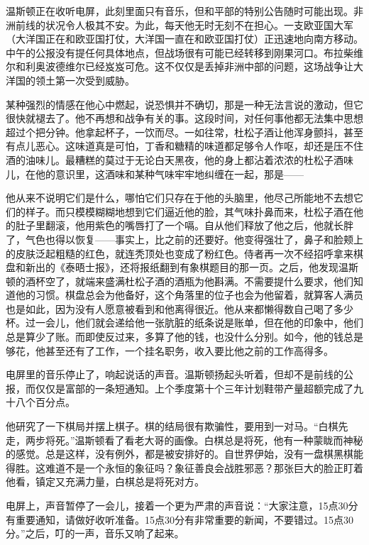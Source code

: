 温斯顿正在收听电屏，此刻里面只有音乐，但和平部的特别公告随时可能出现。非洲前线的状况令人极其不安。为此，每天他无时无刻不在担心。一支欧亚国大军（大洋国正在和欧亚国打仗，大洋国一直在和欧亚国打仗）正迅速地向南方移动。中午的公报没有提任何具体地点，但战场很有可能已经转移到刚果河口。布拉柴维尔和利奥波德维尔已经岌岌可危。这不仅仅是丢掉非洲中部的问题，这场战争让大洋国的领土第一次受到威胁。

某种强烈的情感在他心中燃起，说恐惧并不确切，那是一种无法言说的激动，但它很快就褪去了。他不再想和战争有关的事。这段时间，对任何事他都无法集中思想超过个把分钟。他拿起杯子，一饮而尽。一如往常，杜松子酒让他浑身颤抖，甚至有点儿恶心。这味道真是可怕，丁香和糖精的味道都足够令人作呕，却还是压不住酒的油味儿。最糟糕的莫过于无论白天黑夜，他的身上都沾着浓浓的杜松子酒味儿，在他的意识里，这酒味和某种气味牢牢地纠缠在一起，那是——

他从来不说明它们是什么，哪怕它们只存在于他的头脑里，他尽己所能地不去想它们的样子。而只模模糊糊地想到它们逼近他的脸，其气味扑鼻而来，杜松子酒在他的肚子里翻滚，他用紫色的嘴唇打了一个嗝。自从他们释放了他之后，他就长胖了，气色也得以恢复——事实上，比之前的还要好。他变得强壮了，鼻子和脸颊上的皮肤泛起粗糙的红色，就连秃顶处也变成了粉红色。侍者再一次不经招呼拿来棋盘和新出的《泰晤士报》，还将报纸翻到有象棋题目的那一页。之后，他发现温斯顿的酒杯空了，就端来盛满杜松子酒的酒瓶为他斟满。不需要提什么要求，他们知道他的习惯。棋盘总会为他备好，这个角落里的位子也会为他留着，就算客人满员也是如此，因为没有人愿意被看到和他离得很近。他从来都懒得数自己喝了多少杯。过一会儿，他们就会递给他一张肮脏的纸条说是账单，但在他的印象中，他们总是算少了账。而即使反过来，多算了他的钱，也没什么分别。如今，他的钱总是够花，他甚至还有了工作，一个挂名职务，收入要比他之前的工作高得多。

电屏里的音乐停止了，响起说话的声音。温斯顿扬起头听着，但却不是前线的公报，而仅仅是富部的一条短通知。上个季度第十个三年计划鞋带产量超额完成了九十八个百分点。

他研究了一下棋局并摆上棋子。棋的结局很有欺骗性，要用到一对马。``白棋先走，两步将死。''温斯顿看了看老大哥的画像。白棋总是将死，他有一种蒙眬而神秘的感觉。总是这样，没有例外，都是被安排好的。自世界伊始，没有一盘棋黑棋能得胜。这难道不是一个永恒的象征吗？象征善良会战胜邪恶？那张巨大的脸正盯着他看，镇定又充满力量，白棋总是将死对方。

电屏上，声音暂停了一会儿，接着一个更为严肃的声音说：``大家注意，15点30分有重要通知，请做好收听准备。15点30分有非常重要的新闻，不要错过。15点30分。''之后，叮的一声，音乐又响了起来。

